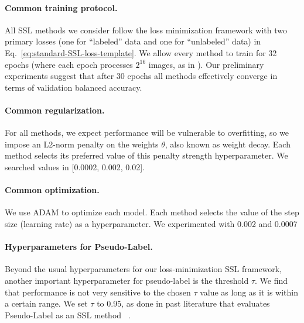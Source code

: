 \paragraph{Common training protocol.}
All SSL methods we consider follow the loss minimization framework with two primary losses (one for ``labeled'' data and one for ``unlabeled'' data) in Eq.~\eqref{eq:standard-SSL-loss-template}.
We allow every method to train for 32 epochs (where each epoch processes $2^{16}$ images, as in \citet{berthelotMixmatchHolisticApproach2019}).
Our preliminary experiments suggest that after 30 epochs all methods effectively converge in terms of validation balanced accuracy. 

\paragraph{Common regularization.}
For all methods, we expect performance will be vulnerable to overfitting, so we impose an L2-norm penalty on the weights $\theta$, also known as weight decay. Each method selects its preferred value of this penalty strength hyperparameter. We searched values in [0.0002, 0.002, 0.02].

\paragraph{Common optimization.}
We use ADAM \citep{kingma2014adam} to optimize each model.
Each method selects the value of the step size (learning rate) as a hyperparameter. We experimented with 0.002 and 0.0007

\paragraph{Hyperparameters for Pseudo-Label.}
Beyond the usual hyperparameters for our loss-minimization SSL framework, another important hyperparameter for pseudo-label is the threshold $\tau$. We find that performance is not very sensitive to the chosen $\tau$ value as long as it is within a certain range. We set $\tau$ to 0.95, as done in past literature that evaluates Pseudo-Label as an SSL method ~\citep{oliverRealisticEvaluationDeep2018,berthelotMixmatchHolisticApproach2019, berthelotRemixmatchSemisupervisedLearning2019, sohnFixmatchSimplifyingSemisupervised2020}.


